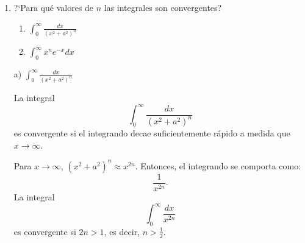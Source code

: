\documentclass{article}
\begin{document}
\begin{enumerate}
\begin{enumerate}
\[
I_2 = \left( \int_{-\infty}^{\infty} e^{-x^2} \, dx \right) \left( \int_{-\infty}^{\infty} e^{-y^2} \, dy \right).
\]

De esta forma, obtenemos:

\[
I_2 = \int_{-\infty}^{\infty} \int_{-\infty}^{\infty} e^{-(x^2 + y^2)} \, dx \, dy.
\]

Este es un caso adecuado para convertir a coordenadas polares. En coordenadas polares, \( x^2 + y^2 = r^2 \), y el diferencial de área \( dx \, dy \) se convierte en \( r \, dr \, d\theta \). Entonces, la integral se convierte en:

\[
I_2 = \int_0^{2\pi} \int_0^{\infty} e^{-r^2} r \, dr \, d\theta.
\]

La integral en \( r \) es una integral que se resuelve con la sustitución \( u = r^2 \), y la integral en \( \theta \) es:

\[
\int_0^{2\pi} d\theta = 2\pi.
\]

La integral en \( r \) se resuelve como:

\[
\int_0^{\infty} e^{-r^2} r \, dr = \frac{1}{2}.
\]

Por lo tanto, se tiene que:

\[
I_2 = 2\pi \cdot \frac{1}{2} = \pi.
\]

Finalmente, tomando la raíz cuadrada, se llega al valor de la integral:

\[
I = \sqrt{\pi}.
\]

Entonces la integral converge y su valor es:

\[
\sqrt{\pi}.
\]

	\end{enumerate}
	
\item ?`Para qu\'e valores de $ n $ las integrales son convergentes?
	\begin{enumerate}
		\item $ \int_{0}^{\infty} \frac{dx}{(x^2+a^2)^n} $
		\item $ \int_{0}^{\infty}x^ne^{-x}dx $
	\end{enumerate}

{a) \(\int_{0}^{\infty} \frac{dx}{(x^{2}+a^{2})^{n}}\)}


La integral
\[
\int_{0}^{\infty} \frac{dx}{(x^{2}+a^{2})^{n}}
\]
es convergente si el integrando decae suficientemente rápido a medida que \(x \to \infty\).

Para \(x \to \infty\), \( (x^2 + a^2)^n \approx x^{2n} \). Entonces, el integrando se comporta como:
\[
\frac{1}{x^{2n}}.
\]
La integral
\[
\int_{0}^{\infty} \frac{dx}{x^{2n}}
\]
es convergente si \(2n > 1\), es decir, \(n > \frac{1}{2}\).


\end{enumerate}
\end{document}
